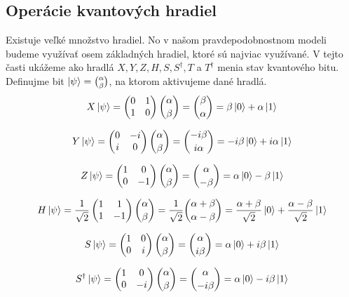 \subsection{Operácie kvantových hradiel}
Existuje veľké množstvo hradiel. No v našom pravdepodobnostnom modeli budeme
využívať osem základných hradiel, ktoré sú najviac využívané. V tejto časti
ukážeme ako hradlá \(X, Y, Z, H, S, S^{\dag}, T\) a \(T^{\dag}\) menia stav
kvantového bitu. Definujme bit \(\ket{\psi} = \binom{\alpha}{\beta}\), na 
ktorom aktivujeme dané hradlá.
\[X\ket{\psi} = 
\begin{pmatrix}
0 & 1 \\
1 & 0 \\
\end{pmatrix}\binom{\alpha}{\beta} = \binom{\beta}{\alpha} = \beta\ket{0} + \alpha\ket{1}\]

\[Y\ket{\psi} = 
\begin{pmatrix}
0 & -i \\
i & 0 \\
\end{pmatrix}\binom{\alpha}{\beta} = \binom{-i\beta}{i\alpha} = -i\beta\ket{0} + i\alpha\ket{1}\]

\[Z\ket{\psi} = 
\begin{pmatrix}
1 & 0 \\
0 & -1 \\
\end{pmatrix}\binom{\alpha}{\beta} = \binom{\alpha}{-\beta} = \alpha\ket{0} - \beta\ket{1}\]

\[H\ket{\psi} = \frac{1}{\sqrt{2}}
\begin{pmatrix}
1 & 1 \\
1 & -1 \\
\end{pmatrix}\binom{\alpha}{\beta} = \frac{1}{\sqrt{2}}\binom{\alpha + \beta}{\alpha - \beta} = \frac{\alpha + \beta}{\sqrt{2}}\ket{0} + \frac{\alpha - \beta}{\sqrt{2}}\ket{1}\]

\[S\ket{\psi} = 
\begin{pmatrix}
1 & 0 \\
0 & i \\
\end{pmatrix}\binom{\alpha}{\beta} = \binom{\alpha}{i\beta} = \alpha\ket{0} + i\beta\ket{1}\]

\[S^{\dag}\ket{\psi} = 
\begin{pmatrix}
1 & 0 \\
0 & -i \\
\end{pmatrix}\binom{\alpha}{\beta} = \binom{\alpha}{-i\beta} = \alpha\ket{0} - i\beta\ket{1}\]

